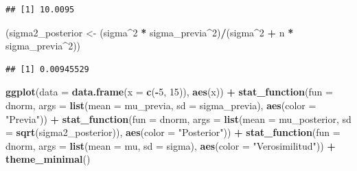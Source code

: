 \documentclass[
  12pt,
]{book}
\newenvironment{Shaded}{\begin{snugshade}}{\end{snugshade}}
\newcommand{\DataTypeTok}[1]{\textcolor[rgb]{0.13,0.29,0.53}{#1}}
\newcommand{\DecValTok}[1]{\textcolor[rgb]{0.00,0.00,0.81}{#1}}
\newcommand{\KeywordTok}[1]{\textcolor[rgb]{0.13,0.29,0.53}{\textbf{#1}}}
\newcommand{\NormalTok}[1]{#1}
\newcommand{\OperatorTok}[1]{\textcolor[rgb]{0.81,0.36,0.00}{\textbf{#1}}}
\newcommand{\StringTok}[1]{\textcolor[rgb]{0.31,0.60,0.02}{#1}}
\begin{document}
\begin{verbatim}
## [1] 10.0095
\end{verbatim}

\begin{Shaded}
\begin{Highlighting}[]
\NormalTok{(sigma2\_posterior \textless{}{-}}\StringTok{ }\NormalTok{(sigma}\OperatorTok{\^{}}\DecValTok{2} \OperatorTok{*}\StringTok{ }\NormalTok{sigma\_previa}\OperatorTok{\^{}}\DecValTok{2}\NormalTok{)}\OperatorTok{/}\NormalTok{(sigma}\OperatorTok{\^{}}\DecValTok{2} \OperatorTok{+}\StringTok{ }
\StringTok{    }\NormalTok{n }\OperatorTok{*}\StringTok{ }\NormalTok{sigma\_previa}\OperatorTok{\^{}}\DecValTok{2}\NormalTok{))}
\end{Highlighting}
\end{Shaded}

\begin{verbatim}
## [1] 0.00945529
\end{verbatim}

\begin{Shaded}
\begin{Highlighting}[]
\KeywordTok{ggplot}\NormalTok{(}\DataTypeTok{data =} \KeywordTok{data.frame}\NormalTok{(}\DataTypeTok{x =} \KeywordTok{c}\NormalTok{(}\OperatorTok{{-}}\DecValTok{5}\NormalTok{, }\DecValTok{15}\NormalTok{)), }\KeywordTok{aes}\NormalTok{(x)) }\OperatorTok{+}\StringTok{ }
\StringTok{    }\KeywordTok{stat\_function}\NormalTok{(}\DataTypeTok{fun =}\NormalTok{ dnorm, }\DataTypeTok{args =} \KeywordTok{list}\NormalTok{(}\DataTypeTok{mean =}\NormalTok{ mu\_previa, }
        \DataTypeTok{sd =}\NormalTok{ sigma\_previa), }\KeywordTok{aes}\NormalTok{(}\DataTypeTok{color =} \StringTok{"Previa"}\NormalTok{)) }\OperatorTok{+}\StringTok{ }
\StringTok{    }\KeywordTok{stat\_function}\NormalTok{(}\DataTypeTok{fun =}\NormalTok{ dnorm, }\DataTypeTok{args =} \KeywordTok{list}\NormalTok{(}\DataTypeTok{mean =}\NormalTok{ mu\_posterior, }
        \DataTypeTok{sd =} \KeywordTok{sqrt}\NormalTok{(sigma2\_posterior)), }\KeywordTok{aes}\NormalTok{(}\DataTypeTok{color =} \StringTok{"Posterior"}\NormalTok{)) }\OperatorTok{+}\StringTok{ }
\StringTok{    }\KeywordTok{stat\_function}\NormalTok{(}\DataTypeTok{fun =}\NormalTok{ dnorm, }\DataTypeTok{args =} \KeywordTok{list}\NormalTok{(}\DataTypeTok{mean =}\NormalTok{ mu, }
        \DataTypeTok{sd =}\NormalTok{ sigma), }\KeywordTok{aes}\NormalTok{(}\DataTypeTok{color =} \StringTok{"Verosimilitud"}\NormalTok{)) }\OperatorTok{+}\StringTok{ }
\StringTok{    }\KeywordTok{theme\_minimal}\NormalTok{()}
\end{Highlighting}
\end{Shaded}
\end{document}
